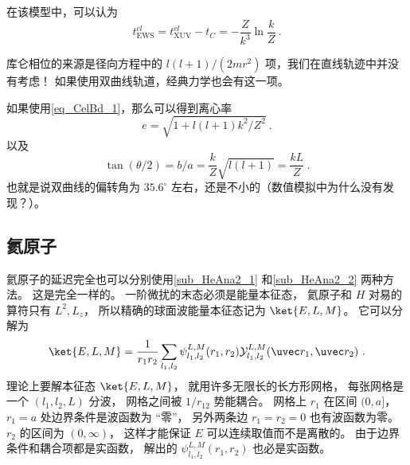 在该模型中，可以认为
\begin{equation}\label{eq_HeAna2_8}
t_\text{EWS}^{cl} = t_\text{XUV}^{cl} - t_C = -\frac{Z}{k^3}\ln\frac{k}{Z}~.
\end{equation}

库仑相位的来源是径向方程中的 $l(l+1)/(2mr^2)$ 项，我们在直线轨迹中并没有考虑！ 如果使用双曲线轨道，经典力学也会有这一项。%

如果使用\autoref{eq_CelBd_1}，那么可以得到离心率
\begin{equation}
e = \sqrt{1 + l(l+1)k^2/Z^2}~.
\end{equation}
以及
\begin{equation}
\tan(\theta/2) = b/a = \frac{k}{Z}\sqrt{l(l+1)} = \frac{kL}{Z}~.
\end{equation}
也就是说双曲线的偏转角为 $35.6^\circ$ 左右，还是不小的（数值模拟中为什么没有发现？）。

\subsection{氦原子}
氦原子的延迟完全也可以分别使用\autoref{sub_HeAna2_1} 和\autoref{sub_HeAna2_2} 两种方法。 这是完全一样的。 一阶微扰的末态必须是能量本征态， 氦原子和 $H$ 对易的算符只有 $L^2, L_z$， 所以精确的球面波能量本征态记为 $\ket{E,L,M}$。 它可以分解为
\begin{equation}
\ket{E,L,M} = \frac{1}{r_1r_2}\sum_{l_1,l_2}\psi_{l_1,l_2}^{L, M}(r_1, r_2)\mathcal Y_{l_1,l_2}^{L, M}(\uvec r_1, \uvec r_2)~.
\end{equation}
理论上要解本征态 $\ket{E,L,M}$， 就用许多无限长的长方形网格， 每张网格是一个 $(l_1,l_2,L)$ 分波， 网格之间被 $1/r_{12}$ 势能耦合。 网格上 $r_1$ 在区间 $(0,a]$， $r_1 = a$ 处边界条件是波函数为 “零”， 另外两条边 $r_1 = r_2 = 0$ 也有波函数为零。 $r_2$ 的区间为 $(0,\infty)$， 这样才能保证 $E$ 可以连续取值而不是离散的。 由于边界条件和耦合项都是实函数， 解出的 $\psi_{l_1,l_2}^{L, M}(r_1, r_2)$ 也必是实函数。

